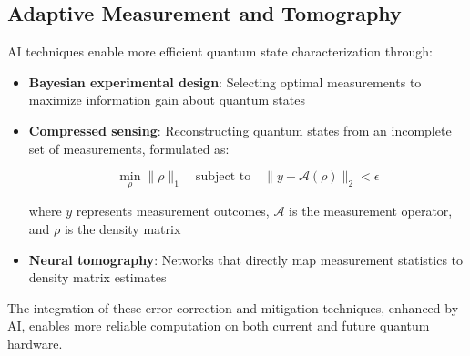 \subsection{Adaptive Measurement and Tomography}
AI techniques enable more efficient quantum state characterization through:

\begin{itemize}
    \item \textbf{Bayesian experimental design}: Selecting optimal measurements to maximize information gain about quantum states
    
    \item \textbf{Compressed sensing}: Reconstructing quantum states from an incomplete set of measurements, formulated as:
    
    \begin{equation}
    \min_\rho \|\rho\|_1 \quad \text{subject to} \quad \|y - \mathcal{A}(\rho)\|_2 < \epsilon
    \end{equation}
    
    where $y$ represents measurement outcomes, $\mathcal{A}$ is the measurement operator, and $\rho$ is the density matrix
    
    \item \textbf{Neural tomography}: Networks that directly map measurement statistics to density matrix estimates
\end{itemize}

The integration of these error correction and mitigation techniques, enhanced by AI, enables more reliable computation on both current and future quantum hardware. 
